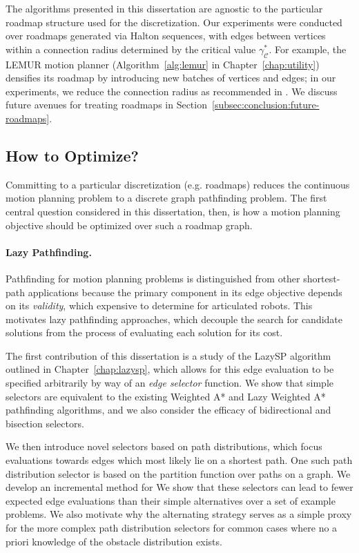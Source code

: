 The algorithms presented in this dissertation are agnostic to the
particular roadmap structure used for the discretization.
Our experiments were conducted over roadmaps generated
via Halton sequences,
with edges between vertices within a connection radius
determined by the critical value $\gamma^*_{\mathcal{C}}$.
For example, the LEMUR motion planner
(Algorithm~\ref{alg:lemur} in Chapter~\ref{chap:utility})
densifies its roadmap by introducing new batches of
vertices and edges;
in our experiments,
we reduce the connection radius as recommended in
\citep{janson2015deterministicsampling}.
We discuss future avenues for treating roadmaps
in Section~\ref{subsec:conclusion:future-roadmaps}.

\subsection{How to Optimize?}
Committing to a particular discretization (e.g. roadmaps)
reduces the continuous motion planning problem
to a discrete graph pathfinding problem.
The first central question considered in this dissertation, then,
is how a motion planning objective should be optimized over
such a roadmap graph.

\paragraph{Lazy Pathfinding.}
Pathfinding for motion planning problems is distinguished from other
shortest-path applications because
the primary component in its edge objective
depends on its \emph{validity},
which expensive to determine for articulated robots.
This motivates lazy pathfinding approaches,
which decouple the search for candidate solutions
from the process of evaluating each solution for its cost.

The first contribution of this dissertation is a study of
the LazySP algorithm outlined in Chapter~\ref{chap:lazysp},
which allows for this edge evaluation to be specified arbitrarily
by way of an \emph{edge selector} function.
We show that simple selectors are equivalent to the existing
Weighted A* and Lazy Weighted A* pathfinding algorithms,
and we also consider the efficacy of bidirectional
and bisection selectors.

We then introduce novel selectors based on path distributions,
which focus evaluations towards edges which most likely lie on
a shortest path.
One such path distribution selector is based on the partition
function over paths on a graph.
We develop an incremental method for 
We show that these selectors can lead to fewer expected edge
evaluations than their simple alternatives over a set of example
problems.
We also motivate why the alternating strategy serves as
a simple proxy for the more complex path distribution selectors
for common cases where no a priori knowledge of the obstacle
distribution exists.

